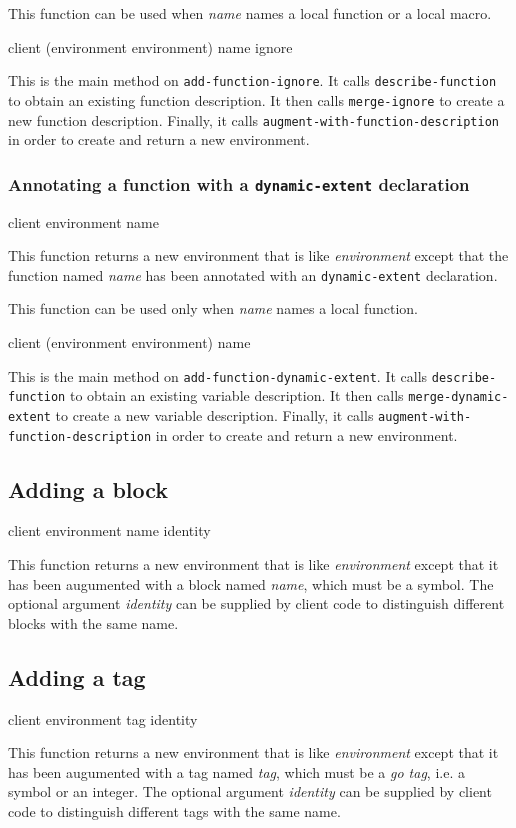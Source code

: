 This function can be used when \textit{name} names a local function or
a local macro.

{\footnotesize
{}
{client
 (environment environment)
 name
 ignore}
}

This is the main method on \texttt{add-function-ignore}.  It calls
\texttt{describe-function} to obtain an existing function description.
It then calls \texttt{merge-ignore} to create a new function
description.  Finally, it calls
\texttt{augment-with-function-description} in order to create and
return a new environment.

\subsubsection{Annotating a function with a \texttt{dynamic-extent} declaration}
\label{sec-annotating-a-function-with-dynamic-extent}

{\footnotesize
{} {client environment name}
}

This function returns a new environment that is like
\textit{environment} except that the function named \textit{name} has
been annotated with an \texttt{dynamic-extent} declaration.

This function can be used only when \textit{name} names a local function.

{\footnotesize
{}
{client
 (environment environment)
 name}
}

This is the main method on \texttt{add-function-dynamic-extent}.  It
calls \texttt{describe-function} to obtain an existing variable
description.  It then calls \texttt{merge-dynamic-extent} to create a new
variable description.  Finally, it calls
\texttt{augment-with-function-description} in order to create and
return a new environment.

\subsection{Adding a block}

{\footnotesize
{} {client environment name \optional identity}
}

This function returns a new environment that is like
\textit{environment} except that it has been augumented with a block
named \textit{name}, which must be a symbol.  The optional argument
\textit{identity} can be supplied by client code to distinguish
different blocks with the same name.

\subsection{Adding a tag}

{\footnotesize
{} {client environment tag \optional identity}
}

This function returns a new environment that is like
\textit{environment} except that it has been augumented with a tag
named \textit{tag}, which must be a \emph{go tag}, i.e. a symbol or an
integer.  The optional argument \textit{identity} can be supplied by
client code to distinguish different tags with the same name.

